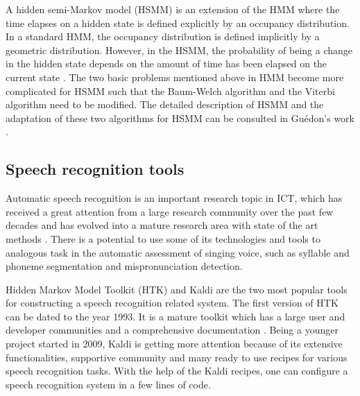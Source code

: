 A hidden semi-Markov model (HSMM) is an extension of the HMM where the time elapses on a hidden state is defined explicitly by an occupancy distribution. In a standard HMM, the occupancy distribution is defined implicitly by a geometric distribution. However, in the HSMM, the probability of being a change in the hidden state depends on the amount of time has been elapsed on the current state \cite{Wikipedia}. The two basic problems mentioned above in HMM become more complicated for HSMM such that the Baum-Welch algorithm and the Viterbi algorithm need to be modified. The detailed description of HSMM and the adaptation of these two algorithms for HSMM can be consulted in Guédon's work \cite{GUEDON20072379}.

\subsection{Speech recognition tools}

Automatic speech recognition is an important research topic in ICT, which has received a great attention from a large research community over the past few decades and has evolved into a mature research area with state of the art methods \cite{an-overview-of-modern-speech-recognition}. There is a potential to use some of its technologies and tools to analogous task in the automatic assessment of singing voice, such as syllable and phoneme segmentation and mispronunciation detection.

Hidden Markov Model Toolkit (HTK) \cite{HTKteam} and Kaldi \cite{Povey2011ASRU} are the two most popular tools for constructing a speech recognition related system. The first version of HTK can be dated to the year 1993. It is a mature toolkit which has a large user and developer communities and a comprehensive documentation \cite{Young2006HTK}. Being a younger project started in 2009, Kaldi is getting more attention because of its extensive functionalities, supportive community and many ready to use recipes for various speech recognition tasks. With the help of the Kaldi recipes, one can configure a speech recognition system in a few lines of code.

